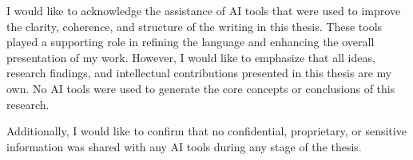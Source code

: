 I would like to acknowledge the assistance of AI tools that were used to improve the clarity, coherence, and structure of the writing in this thesis.
These tools played a supporting role in refining the language and enhancing the overall presentation of my work.
However, I would like to emphasize that all ideas, research findings, and intellectual contributions presented in this thesis are my own.
No AI tools were used to generate the core concepts or conclusions of this research.

Additionally, I would like to confirm that no confidential, proprietary, or sensitive information was shared with any AI tools during any stage of the thesis.
